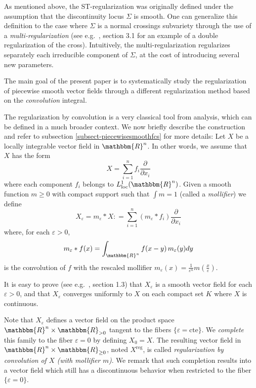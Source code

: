 \documentclass[11pt,psamsfonts]{article}
\theoremstyle{definition}
\theoremstyle{remark}
\newcommand{\cR}{\ensuremath{\mathbbm{R}}}
\newcommand{\eps}{\varepsilon }
\newcommand{\reg}{\mathrm{reg}}
\begin{document}
As mentioned above, the ST-regularization was originally defined under the assumption that the discontinuity locus $\Sigma$ is smooth.  One can generalize this definition to the case where $\Sigma$ is a normal crossings subvariety through the use of a {\em multi-regularization} (see e.g.~\cite{PS}, section 3.1 for an example of a double regularization of the cross). Intuitively, the multi-regularization regularizes separately each irreducible component of $\Sigma$, at the cost of introducing several new parameters.
 
The main goal of the present paper is to systematically study the regularization of piecewise smooth vector fields through a different regularization method based on the {\em convolution} integral. 

The regularization by convolution is a very classical tool from analysis, which can be defined in a much broader context.  We now briefly describe the construction and refer to subsection \ref{subsect-piecewisesmoothfcs} for more details:  Let $X$ be a locally integrable vector field in $\cR^n$. In other words, we assume that $X$ has the form 
$$
X = \sum_{i=1}^n f_i \frac{\partial}{\partial x_i}
$$
where each component $f_i$ belongs to $L^1_{\mathrm{loc}}(\cR^n)$. 
Given a smooth function $m\ge 0$ with compact support such that $\displaystyle \int m = 1$ (called a {\em mollifier}) we define 
\begin{equation}
\label{regularization-expression}
X_\eps = m_\eps \ast X : =  \sum_{i=1}^n (m_\eps\ast f_i)  \frac{\partial}{\partial x_i} 
\end{equation}
where, for each $\eps > 0$,
$$
m_\eps\ast f(x) = \int_{\cR^n} f(x-y)\, m_\eps(y) dy
$$
is the convolution of $f$ with the rescaled mollifier $m_\eps(x) = \frac{1}{\eps^n}m(\frac{x}{\eps})$. 

It is easy to prove (see e.g.~\cite{HormanderI}, section 1.3) that $X_\eps$ is a smooth vector field for each $\eps > 0$, and that $X_\eps$ converges uniformly to $X$ on each 
compact set $K$ where $X$ is continuous. 

Note that $X_\eps$ defines a vector field on the product space $\cR^n \times \cR_{>0}$ tangent to the fibers $\{\eps = \mathrm{cte}\}$. We {\em complete} this family to the fiber $\eps = 0$ by defining $X_0 = X$. The resulting vector field in $\cR^n \times \cR_{\ge 0}$, noted $X^\reg$, is called {\em regularization by convolution of $X$ (with mollifier $m$)}.  We remark that such completion results into a vector field which still has a discontinuous behavior when restricted to the fiber $\{\eps = 0\}$.  
\end{document}
